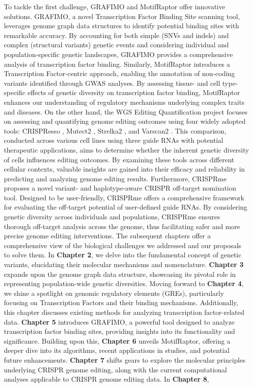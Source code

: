 \documentclass[a4paper, titlepage, openright]{book}
\newcommand{\grafimo}{GRAFIMO\xspace}
\newcommand{\crisprme}{CRISPRme\xspace}
\newcommand{\motifraptor}{MotifRaptor\xspace}
\begin{document}
%
To tackle the first challenge, \grafimo \citep{tognon2021grafimo} and \motifraptor \citep{yao2021motif} offer innovative solutions. \grafimo, a novel Transcription Factor Binding Site scanning tool, leverages genome graph data structures to identify potential binding sites with remarkable accuracy. By accounting for both simple (SNVs and indels) and complex (structural variants) genetic events and considering individual and population-specific genetic landscapes, \grafimo provides a comprehensive analysis of transcription factor binding. Similarly, \motifraptor introduces a Transcription Factor-centric approach, enabling the annotation of non-coding variants identified through GWAS analyses. By assessing tissue- and cell type-specific effects of genetic diversity on transcription factor binding, \motifraptor enhances our understanding of regulatory mechanisms underlying complex traits and diseases. On the other hand, the WGS Editing Quantification project focuses on assessing and quantifying genome editing outcomes using four widely adopted tools: CRISPResso \citep{clement2019crispresso2}, Mutect2 \citep{mckenna2010genome}, Strelka2 \citep{kim2018strelka2}, and Varscan2 \citep{koboldt2012varscan}. This comparison, conducted across various cell lines using three guide RNAs with potential therapeutic applications, aims to determine whether the inherent genetic diversity of cells influences editing outcomes. By examining these tools across different cellular contexts, valuable insights are gained into their efficacy and reliability in predicting and analyzing genome editing results. Furthermore, \crisprme \citep{cancellieri2023human} proposes a novel variant- and haplotype-aware CRISPR off-target nomination tool. Designed to be user-friendly, \crisprme offers a comprehensive framework for evaluating the off-target potential of user-defined guide RNAs. By considering genetic diversity across individuals and populations, \crisprme ensures thorough off-target analysis across the genome, thus facilitating safer and more precise genome editing interventions. The subsequent chapters offer a comprehensive view of the biological challenges we addressed and our proposals to solve them. In \textbf{Chapter 2}, we delve into the fundamental concept of genetic variants, elucidating their molecular mechanisms and nomenclature. \textbf{Chapter 3} expands upon the genome graph data structure, showcasing its pivotal role in representing population-wide genetic diversities. Moving forward to \textbf{Chapter 4}, we shine a spotlight on genomic regulatory elements (GREs), particularly focusing on Transcription Factors and their binding mechanisms. Additionally, this chapter discusses existing methods for analyzing transcription factor-related data. \textbf{Chapter 5} introduces \grafimo, a powerful tool designed to analyze transcription factor binding sites, providing insights into its functionality and significance. Building upon this, \textbf{Chapter 6} unveils \motifraptor, offering a deeper dive into its algorithms, recent applications in studies, and potential future enhancements. \textbf{Chapter 7} shifts gears to explore the molecular principles underlying CRISPR genome editing, along with the current computational analyses applicable to CRISPR genome editing data. In \textbf{Chapter 8}, 
\end{document}
